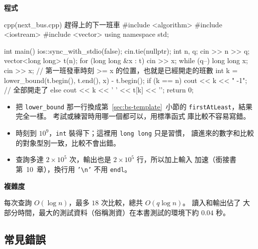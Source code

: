 \textbf{程式}

\begin{example}[label=ex:next-bus]{cpp}{(next\_bus.cpp) 趕得上的下一班車}
#include <algorithm>
#include <iostream>
#include <vector>
using namespace std;

int main() {
    ios::sync_with_stdio(false);
    cin.tie(nullptr);
    int n, q;
    cin >> n >> q;
    vector<long long> t(n);
    for (long long &x : t) {
        cin >> x;
    }
    while (q--) {
        long long x;
        cin >> x;
        // 第一班發車時刻 >= x 的位置，也就是已經開走的班數
        int k = lower_bound(t.begin(), t.end(), x) - t.begin();
        if (k == n) {
            cout << k << " -1\n";        // 全部開走了
        } else {
            cout << k << ' ' << t[k] << '\n';
        }
    }
    return 0;
}
\end{example}


\begin{itemize}
\item 把 \texttt{lower\_bound} 那一行換成第~\ref{sec:bs-template}~小節的
\texttt{firstAtLeast}，結果完全一樣。 考試或練習時用哪一個都可以，用標準函式
庫比較不容易寫錯。
\item 時刻到 $10^9$，\texttt{int} 裝得下；這裡用 \texttt{long long} 只是習慣，
讀進來的數字和比較的對象型別一致，比較不會出錯。
\item 查詢多達 $2 \times 10^5$ 次，輸出也是 $2 \times 10^5$ 行，所以加上輸入
加速（銜接書第~10~章），換行用 \texttt{'\textbackslash n'} 不用
\texttt{endl}。
\end{itemize}

\textbf{複雜度}

每次查詢 $O(\log n)$，最多 $18$ 次比較，總共 $O(q \log n)$。 讀入和輸出佔了
大部分時間，最大的測試資料（俗稱測資）在本書測試的環境下約 $0.04$ 秒。

\subsection{常見錯誤}

